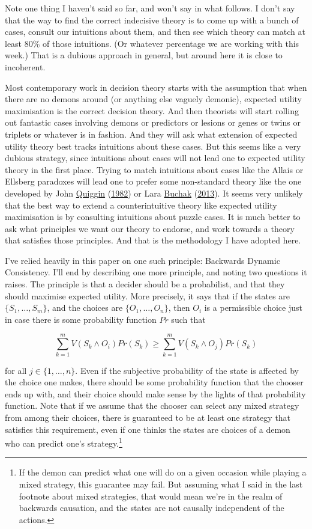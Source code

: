 \documentclass[
  12pt,
]{article}
\begin{document}
Note one thing I haven't said so far, and won't say in what follows. I
don't say that the way to find the correct indecisive theory is to come
up with a bunch of cases, consult our intuitions about them, and then
see which theory can match at least 80\% of those intuitions. (Or
whatever percentage we are working with this week.) That is a dubious
approach in general, but around here it is close to incoherent.

Most contemporary work in decision theory starts with the assumption
that when there are no demons around (or anything else vaguely demonic),
expected utility maximisation is the correct decision theory. And then
theorists will start rolling out fantastic cases involving demons or
predictors or lesions or genes or twins or triplets or whatever is in
fashion. And they will ask what extension of expected utility theory
best tracks intuitions about these cases. But this seems like a very
dubious strategy, since intuitions about cases will not lead one to
expected utility theory in the first place. Trying to match intuitions
about cases like the Allais or Ellsberg paradoxes will lead one to
prefer some non-standard theory like the one developed by John
\protect\hyperlink{ref-Quiggin1982}{Quiggin}
(\protect\hyperlink{ref-Quiggin1982}{1982}) or Lara
\protect\hyperlink{ref-BuchakRisk}{Buchak}
(\protect\hyperlink{ref-BuchakRisk}{2013}). It seems very unlikely that
the best way to extend a counterintuitive theory like expected utility
maximisation is by consulting intuitions about puzzle cases. It is much
better to ask what principles we want our theory to endorse, and work
towards a theory that satisfies those principles. And that is the
methodology I have adopted here.

I've relied heavily in this paper on one such principle: Backwards
Dynamic Consistency. I'll end by describing one more principle, and
noting two questions it raises. The principle is that a decider should
be a probabilist, and that they should maximise expected utility. More
precisely, it says that if the states are \(\{S_1, \dots, S_m\}\), and
the choices are \(\{O_1, \dots, O_n\}\), then \(O_i\) is a permissible
choice just in case there is some probability function \(Pr\) such that

\[
\sum_{k = 1}^m V(S_k \wedge O_i)Pr(S_k) \geq \sum_{k = 1}^m V(S_k \wedge O_j)Pr(S_k)
\]

for all \(j \in \{1, \dots, n\}\). Even if the subjective probability of
the state is affected by the choice one makes, there should be some
probability function that the chooser ends up with, and their choice
should make sense by the lights of that probability function. Note that
if we assume that the chooser can select any mixed strategy from among
their choices, there is guaranteed to be at least one strategy that
satisfies this requirement, even if one thinks the states are choices of
a demon who can predict one's strategy.\footnote{If the demon can
  predict what one will do on a given occasion while playing a mixed
  strategy, this guarantee may fail. But assuming what I said in the
  last footnote about mixed strategies, that would mean we're in the
  realm of backwards causation, and the states are not causally
  independent of the actions.}
\end{document}
